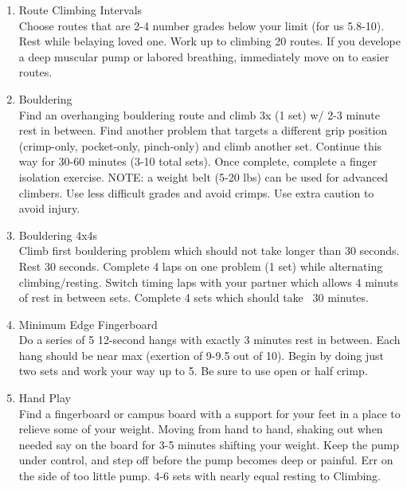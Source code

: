 \documentclass[12pt, letterpaper]{article}
\begin{document}
\begin{enumerate}
      
      \item Route Climbing Intervals \\ 
            Choose routes that are 2-4 number grades below your limit (for us 5.8-10). 
            Rest while belaying loved one. Work up to climbing 20 routes. If you develope 
            a deep muscular pump or labored breathing, immediately move on to easier routes.
            
      \item Bouldering \\ 
            Find an overhanging bouldering route and climb 3x (1 set) w/ 2-3 minute rest
            in between. Find another problem that targets a different grip position
            (crimp-only, pocket-only, pinch-only) and climb another set. 
            Continue this way for 30-60 minutes (3-10 total sets).
            Once complete, complete a finger isolation exercise.
            NOTE: a weight belt (5-20 lbs) can be used for advanced climbers. 
            Use less difficult grades and avoid crimps. Use extra caution to avoid injury.
            
      \item Bouldering 4x4s \\ 
            Climb first bouldering problem which should not take longer than 
            30 seconds. Rest 30 seconds. Complete 4 laps on one problem (1 set)
            while alternating climbing/resting. Switch timing laps with your partner
            which allows 4 minuts of rest in between sets. Complete 4 sets which
            should take ~30 minutes.
      
       \item Minimum Edge Fingerboard \\ 
            Do a series of 5 12-second hangs with exactly 3 minutes rest in between. 
            Each hang should be near max (exertion of 9-9.5 out of 10). Begin by 
            doing just two sets and work your way up to 5. Be sure to use open or half crimp. 

       \item Hand Play \\ 
            Find a fingerboard or campus board with a support for your feet in a place to 
            relieve some of your weight. Moving from hand to hand, shaking out when needed 
            say on the board for 3-5 minutes shifting your weight. Keep the pump under
            control, and step off before the pump becomes deep or painful. Err on the side
            of too little pump. 4-6 sets with nearly equal resting to Climbing.

\end{enumerate}
\end{document}
